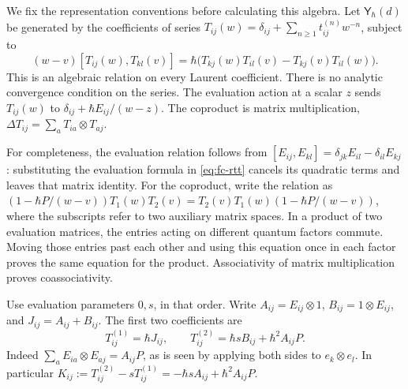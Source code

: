 We fix the representation conventions before calculating this algebra.
Let \(\mathsf Y_\hbar(d)\) be generated by the coefficients of series
\(T_{ij}(w)=\delta_{ij}+\sum_{n\geq1}t_{ij}^{(n)}w^{-n}\), subject to
\begin{equation}\label{eq:fc-rtt}
 (w-v)[T_{ij}(w),T_{kl}(v)]
 =\hbar\bigl(T_{kj}(w)T_{il}(v)-T_{kj}(v)T_{il}(w)\bigr).
\end{equation}
This is an algebraic relation on every Laurent coefficient. There is no
analytic convergence condition on the series. The evaluation action at a
scalar \(z\) sends \(T_{ij}(w)\) to
\(\delta_{ij}+\hbar E_{ij}/(w-z)\). The coproduct is matrix
multiplication, \(\Delta T_{ij}=\sum_aT_{ia}\otimes T_{aj}\).

For completeness, the evaluation relation follows from
\([E_{ij},E_{kl}]=\delta_{jk}E_{il}-\delta_{il}E_{kj}\): substituting
the evaluation formula in \eqref{eq:fc-rtt} cancels its quadratic terms
and leaves that matrix identity. For the coproduct, write the relation as
\((1-\hbar P/(w-v))T_1(w)T_2(v)
=T_2(v)T_1(w)(1-\hbar P/(w-v))\), where the subscripts refer to two
auxiliary matrix spaces. In a product of two evaluation matrices, the
entries acting on different quantum factors commute. Moving those entries
past each other and using this equation once in each factor proves the
same equation for the product. Associativity of matrix multiplication
proves coassociativity.

Use evaluation parameters \(0,s\), in that order. Write
\(A_{ij}=E_{ij}\otimes1\), \(B_{ij}=1\otimes E_{ij}\), and
\(J_{ij}=A_{ij}+B_{ij}\). The first two coefficients are
\begin{equation}\label{eq:fc-coefficients}
 T^{(1)}_{ij}=\hbar J_{ij},\qquad
 T^{(2)}_{ij}=\hbar sB_{ij}+\hbar^2 A_{ij}P.
\end{equation}
Indeed \(\sum_aE_{ia}\otimes E_{aj}=A_{ij}P\), as is seen by applying
both sides to \(e_k\otimes e_l\). In particular
\(K_{ij}:=T^{(2)}_{ij}-sT^{(1)}_{ij}
=-\hbar sA_{ij}+\hbar^2A_{ij}P\).

